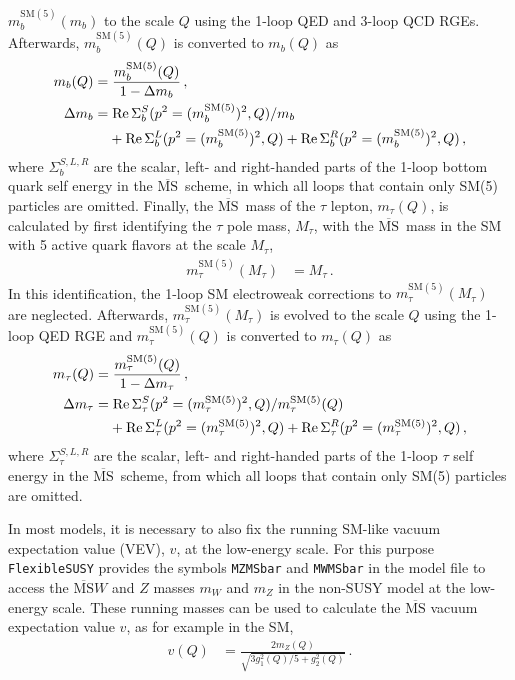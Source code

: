 \documentclass[final,3p,11pt,pdflatex]{elsarticle}
\makeatletter
\newcommand{\fs}{\texttt{FlexibleSUSY}\@\xspace}
\newcommand{\code}[1]{\lstinline|#1|}  %
\newcommand{\ol}[1]{\overline{#1}}
\newcommand{\MSbar}{\ensuremath{\ol{\text{MS}}}\xspace}
\newcommand{\SM}{\ensuremath{\text{SM}}\xspace}
\DeclareMathOperator{\re}{Re}
\makeatother
\begin{document}
$m_b^{\SM(5)}(m_b)$ to the scale $Q$ using the 1-loop QED and 3-loop
QCD RGEs.  Afterwards, $m_b^{\SM(5)}(Q)$ is converted to $m_b(Q)$ as
%
\begin{align}
  m_b(Q) &= \frac{m_b^{\SM(5)}(Q)}{1 - \Delta m_b} \,, \\
  \Delta m_b &= \re\Sigma_{b}^S(p^2=(m_b^{\SM(5)})^2,Q)/m_b \notag\\
  &\phantom{={}}+ \re\Sigma_{b}^L(p^2=(m_b^{\SM(5)})^2,Q)
  + \re\Sigma_{b}^R(p^2=(m_b^{\SM(5)})^2,Q) \,,
  \label{eq:bottom-conversion}
\end{align}
%
where $\Sigma_{b}^{S,L,R}$ are the scalar, left- and right-handed
parts of the 1-loop bottom quark self energy in the \MSbar\ scheme, in
which all loops that contain only SM(5) particles are omitted.  Finally, the
\MSbar\ mass of the $\tau$ lepton, $m_\tau(Q)$, is calculated by first
identifying the $\tau$ pole mass, $M_\tau$, with the \MSbar\ mass in
the SM with 5 active quark flavors at the scale $M_\tau$,
%
\begin{align}
  m_\tau^{\SM(5)}(M_\tau) &=  M_\tau \,.
\end{align}
%
In this identification, the 1-loop SM electroweak
corrections to $m_\tau^{\SM(5)}(M_\tau)$ are neglected.  Afterwards,
$m_\tau^{\SM(5)}(M_\tau)$ is evolved to the scale $Q$ using the 1-loop QED RGE
and $m_\tau^{\SM(5)}(Q)$ is converted to $m_\tau(Q)$ as
%
\begin{align}
  m_\tau(Q) &= \frac{m_\tau^{\SM(5)}(Q)}{1 - \Delta m_\tau} \,, \\
  \Delta m_\tau &=
  \re\Sigma_{\tau}^S(p^2=(m_\tau^{\SM(5)})^2,Q) / m_\tau^{\SM(5)}(Q) \notag \\
  &\phantom{={}}
  + \re\Sigma_{\tau}^L(p^2=(m_\tau^{\SM(5)})^2,Q)
    + \re\Sigma_{\tau}^R(p^2=(m_\tau^{\SM(5)})^2,Q) \,,
\end{align}
%
where $\Sigma_{\tau}^{S,L,R}$ are the scalar, left- and right-handed
parts of the 1-loop $\tau$ self energy in the \MSbar\ scheme,
from which all loops that contain only SM(5) particles are omitted.

In most models, it is necessary to also fix the running SM-like vacuum
expectation value (VEV), $v$, at the low-energy scale.  For this purpose \fs
provides the symbols \code{MZMSbar} and \code{MWMSbar} in the model
file to access the \MSbar $W$ and $Z$ masses $m_W$ and $m_Z$ in the
non-SUSY model at the low-energy scale.  These running masses can be
used to calculate the \MSbar vacuum expectation value $v$, as for
example in the SM,
%
\begin{align}
  v(Q) &= \frac{2 m_Z(Q)}{\sqrt{3 g_1^2(Q) / 5+ g_2^2(Q)}} \,.
\end{align}
\end{document}
